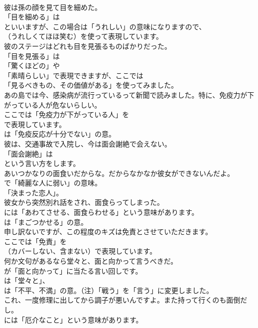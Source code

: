 \documentclass[8pt]{extreport}
\begin{document}
\begin{CJK}{UTF8}{min}
\\	彼は孫の顔を見て目を細めた。 
\\	「目を細める」は
\\	といいますが、この場合は「うれしい」の意味になりますので、
\\	（うれしくてほほ笑む）を使って表現しています。	
\\	彼のステージはどれも目を見張るものばかりだった。 
\\	「目を見張る」は
\\	「驚くほどの」や
\\	「素晴らしい」で表現できますが、ここでは
\\	「見るべきもの、その価値がある」を使ってみました。	
\\	あの島では今、感染病が流行っているって新聞で読みました。特に、免疫力が下がっている人が危ないらしい。 
\\	ここでは「免疫力が下がっている人」を 
\\	で表現しています。
\\	は「免疫反応が十分でない」の意。	
\\	彼は、交通事故で入院し、今は面会謝絶で会えない。 
\\	「面会謝絶」は
\\	という言い方をします。	
\\	あいつかなりの面食いだからな。だからなかなか彼女ができないんだよ。 
\\	で「綺麗な人に弱い」の意味。
\\	「決まった恋人」。	
\\	彼女から突然別れ話をされ、面食らってしまった。 
\\	には「あわてさせる、面食らわせる」という意味があります。
\\	は「まごつかせる」の意。	
\\	申し訳ないですが、この程度のキズは免責とさせていただきます。 
\\	ここでは「免責」を
\\	（カバーしない、含まない）で表現しています。	
\\	何か文句があるなら堂々と、面と向かって言うべきだ。 
\\	が「面と向かって」に当たる言い回しです。
\\	は「堂々と」、
\\	は「不平、不満」の意。（注）「戦う」を「言う」に変更しました。	
\\	これ、一度修理に出してから調子が悪いんですよ。また持って行くのも面倒だし。 
\\	には「厄介なこと」という意味があります。	

\end{CJK}
\end{document}
